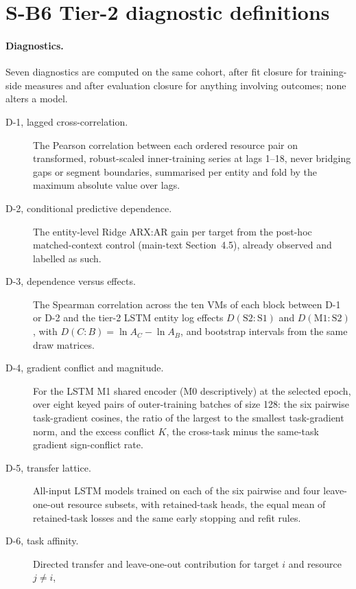 \documentclass[a4paper,11pt]{article}
\begin{document}
\clearpage
\section*{S-B6 Tier-2 diagnostic definitions}
\paragraph{Diagnostics.} Seven diagnostics are computed on the same cohort,
after fit closure for training-side measures and after evaluation closure for
anything involving outcomes; none alters a model.
\begin{description}
  \item[D-1, lagged cross-correlation.] The Pearson correlation between
    each
    ordered resource pair on transformed, robust-scaled inner-training series
    at lags 1--18, never bridging gaps or segment boundaries, summarised per
    entity and fold by the maximum absolute value over lags.
  \item[D-2, conditional predictive dependence.] The entity-level Ridge
    ARX:AR gain per target from the post-hoc matched-context control
    (main-text Section~4.5), already observed and labelled as
    such.
  \item[D-3, dependence versus effects.] The Spearman correlation across the
    ten VMs of each block between D-1 or D-2 and the tier-2 LSTM entity log
    effects $D(\mathrm{S2}\!:\!\mathrm{S1})$ and
    $D(\mathrm{M1}\!:\!\mathrm{S2})$, with $D(C\!:\!B)=\ln A_C-\ln A_B$, and
    bootstrap intervals from the same draw matrices.
  \item[D-4, gradient conflict and magnitude.] For the LSTM M1 shared encoder
    (M0 descriptively) at the selected epoch, over eight keyed pairs of
    outer-training batches of size 128: the six pairwise task-gradient
    cosines, the ratio of the largest to the smallest task-gradient norm, and
    the excess conflict $K$, the cross-task minus the same-task gradient
    sign-conflict rate.
  \item[D-5, transfer lattice.] All-input LSTM models trained on each of the
    six pairwise and four leave-one-out resource subsets, with retained-task
    heads, the equal mean of retained-task losses and the same early
    stopping and refit rules.
  \item[D-6, task affinity.] Directed transfer and leave-one-out
    contribution for target $i$ and resource $j\neq i$,
    \begin{equation*}
      \begin{aligned}

\end{aligned}
\end{equation*}
\end{description}
\end{document}

